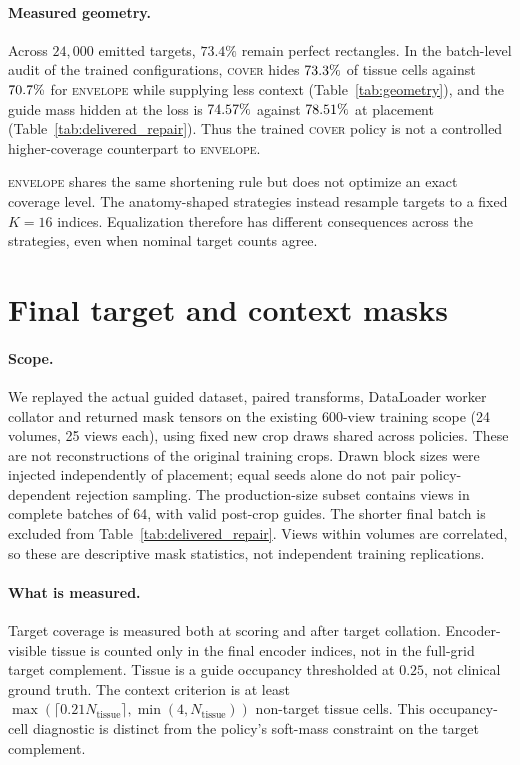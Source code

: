 \documentclass{article}
\begin{document}
\paragraph{Measured geometry.}
Across $24{,}000$ emitted targets, $73.4\%$ remain perfect rectangles.
In the batch-level audit of the trained configurations, \textsc{cover} hides
$73.3\%$ of tissue cells against $70.7\%$ for \textsc{envelope}
while supplying less context (Table~\ref{tab:geometry}), and the guide mass
hidden at the loss is $74.57\%$ against
$78.51\%$ at placement (Table~\ref{tab:delivered_repair}).
Thus the trained \textsc{cover} policy is not a controlled higher-coverage
counterpart to \textsc{envelope}.

\textsc{envelope} shares the same shortening rule but does not optimize an
exact coverage level. The anatomy-shaped strategies instead resample
targets to a fixed $K{=}16$ indices. Equalization therefore has different
consequences across the strategies, even when nominal target counts agree.

\section{Final target and context masks}
\label{app:delivered_audit}

\paragraph{Scope.}
We replayed the actual guided dataset, paired transforms, DataLoader worker
collator and returned mask tensors on the existing 600-view training scope
(24 volumes, 25 views each), using fixed new crop draws shared across policies.
These are not reconstructions of the original training crops. Drawn block sizes were
injected independently of placement; equal seeds alone do not pair
policy-dependent rejection sampling. The production-size subset contains
\DTFullImages{} views in complete batches of 64, with \DTValidGuides{} valid
post-crop guides. The shorter final batch is excluded from
Table~\ref{tab:delivered_repair}. Views within volumes are correlated, so these
are descriptive mask statistics, not independent training replications.

\paragraph{What is measured.}
Target coverage is measured both at scoring and after target collation.
Encoder-visible tissue is counted only in the final encoder indices, not
in the full-grid target complement. Tissue is a guide occupancy thresholded
at $0.25$, not clinical ground truth. The context criterion is at least
$\max(\lceil 0.21N_{\mathrm{tissue}}\rceil,\min(4,N_{\mathrm{tissue}}))$
non-target tissue cells. This occupancy-cell diagnostic is distinct from
the policy's soft-mass constraint on the target complement.
\end{document}
